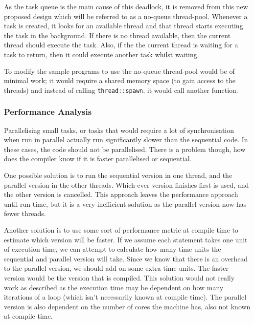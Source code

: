\documentclass[conference]{IEEEtran}
\begin{document}
As the task queue is the main cause of this deadlock, it is removed from this new proposed design which will be referred to as a no-queue thread-pool. Whenever a task is created, it looks for an available thread and that thread starts executing the task in the background. If there is no thread available, then the current thread should execute the task. Also, if the the current thread is waiting for a task to return, then it could execute another task whilst waiting.  

To modify the sample programs to use the no-queue thread-pool would be of minimal work; it would require a shared memory space (to gain access to the threads) and instead of calling \texttt{thread::spawn}, it would call another function.

\subsubsection{Performance Analysis}
Parallelising small tasks, or tasks that would require a lot of synchronisation when run in parallel actually run significantly slower than the sequential code. In these cases, the code should not be parallelised. There is a problem though, how does the compiler know if it is faster parallelised or sequential.

One possible solution is to run the sequential version in one thread, and the parallel version in the other threads. Which-ever version finishes first is used, and the other version is cancelled. This approach leaves the performance approach until run-time, but it is a very inefficient solution as the parallel version now has fewer threads.

Another solution is to use some sort of performance metric at compile time to estimate which version will be faster. If we assume each statement takes one unit of execution time, we can attempt to calculate how many time units the sequential and parallel version will take. Since we know that there is an overhead to the parallel version, we should add on some extra time units. The faster version would be the version that is compiled. This solution would not really work as described as the execution time may be dependent on how many iterations of a loop (which isn't necessarily known at compile time). The parallel version is also dependent on the number of cores the machine has, also not known at compile time.
\end{document}
